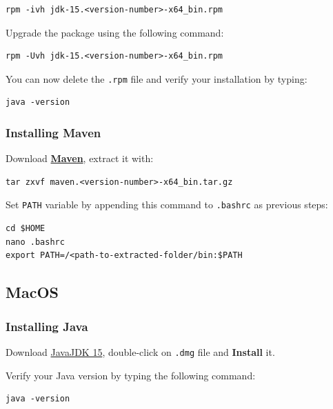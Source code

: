 \documentclass[table, 12pt]{article}
\begin{document}
\begin{verbatim}
rpm -ivh jdk-15.<version-number>-x64_bin.rpm
\end{verbatim}

Upgrade the package using the following command:

\begin{verbatim}
rpm -Uvh jdk-15.<version-number>-x64_bin.rpm 
\end{verbatim}

You can now delete the \texttt{.rpm} file and verify your installation
by typing:

\begin{verbatim}
java -version
\end{verbatim}

\subsubsection{Installing Maven}\label{installing-maven-1}

Download
\textbf{\href{https://mirror.nohup.it/apache/maven/maven-3/3.6.3/binaries/apache-maven-3.6.3-bin.tar.gz}{Maven}},
extract it with:

\begin{verbatim}
tar zxvf maven.<version-number>-x64_bin.tar.gz
\end{verbatim}

Set \texttt{PATH} variable by appending this command to \texttt{.bashrc}
as previous steps:

\begin{verbatim}
cd $HOME 
nano .bashrc
export PATH=/<path-to-extracted-folder/bin:$PATH
\end{verbatim}

\subsection{MacOS}\label{macos}

\subsubsection{Installing Java}\label{installing-java-2}

Download
\href{https://www.oracle.com/java/technologies/javase/jdk15-archive-downloads.html}{JavaJDK
15}, double-click on \texttt{.dmg} file and \textbf{Install} it.

Verify your Java version by typing the following command:

\begin{verbatim}
java -version
\end{verbatim}
\end{document}
